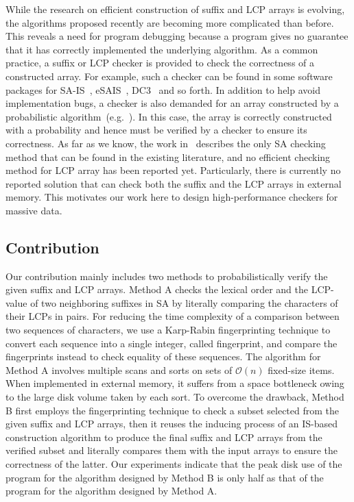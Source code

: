 \documentclass[10pt,journal,compsoc]{IEEEtran}
\begin{document}
While the research on efficient construction of suffix and LCP arrays is evolving, the algorithms proposed recently are becoming more complicated than before. This reveals a need for program debugging because a program gives no guarantee that it has correctly implemented the underlying algorithm. As a common practice, a suffix or LCP checker is provided to check the correctness of a constructed array. For example, such a checker can be found in some software packages for SA-IS~\cite{Nong11}, eSAIS~\cite{Bingmann12}, DC3~\cite{Dementiev08} and so forth. In addition to help avoid implementation bugs, a checker is also demanded for an array constructed by a probabilistic algorithm~(e.g.~\cite{Bille2013}). In this case, the array is correctly constructed with a probability and hence must be verified by a checker to ensure its correctness. As far as we know, the work in~\cite{Burkhardt2003} describes the only SA checking method that can be found in the existing literature, and no efficient checking method for LCP array has been reported yet. Particularly, there is currently no reported solution that can check both the suffix and the LCP arrays in external memory. This motivates our work here to design high-performance checkers for massive data.  
	
\subsection{Contribution}\label{sec:introduction:contribution}

Our contribution mainly includes two methods to probabilistically verify the given suffix and LCP arrays. Method A checks the lexical order and the LCP-value of two neighboring suffixes in SA by literally comparing the characters of their LCPs in pairs. For reducing the time complexity of a comparison between two sequences of characters, we use a Karp-Rabin fingerprinting technique to convert each sequence into a single integer, called fingerprint, and compare the fingerprints instead to check equality of these sequences. The algorithm for Method A involves multiple scans and sorts on sets of $\mathcal{O}(n)$ fixed-size items. When implemented in external memory, it suffers from a space bottleneck owing to the large disk volume taken by each sort. 
To overcome the drawback, Method B first employs the fingerprinting technique to check a subset selected from the given suffix and LCP arrays, then it reuses the inducing process of an IS-based construction algorithm to produce the final suffix and LCP arrays from the verified subset and literally compares them with the input arrays to ensure the correctness of the latter. Our experiments indicate that the peak disk use of the program for the algorithm designed by Method B is only half as that of the program for the algorithm designed by Method A.
\end{document}
